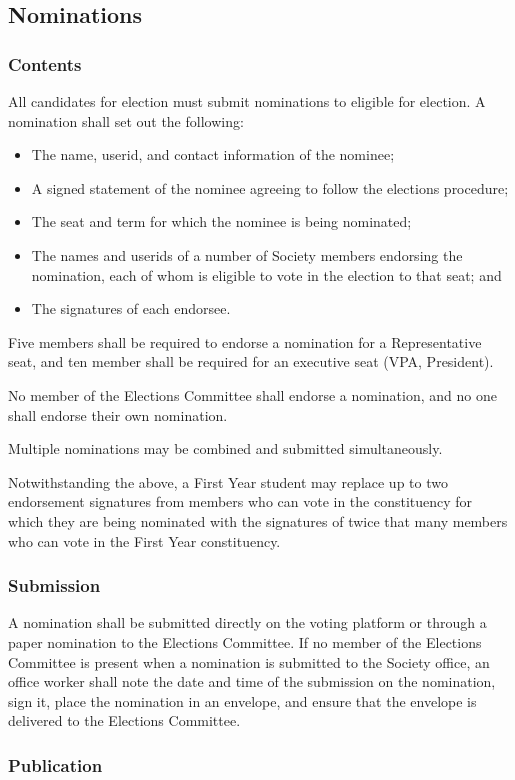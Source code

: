 \subsection{Nominations}
\subsubsection{Contents}
All candidates for election must submit nominations to eligible for election.
A nomination shall set out the following:
\begin{itemize}
\item The name, userid, and contact information of the nominee;
\item A signed statement of the nominee agreeing to follow the elections
procedure;
\item The seat and term for which the nominee is being nominated;
\item The names and userids of a number of Society members endorsing the
nomination, each of whom is eligible to vote in the election to that seat; and
\item The signatures of each endorsee.
\end{itemize}
Five members shall be required to endorse a nomination for a Representative
seat, and ten member shall be required for an executive seat (VPA, President). 

No member of the Elections Committee
shall endorse a nomination, and no one shall endorse their own nomination.

Multiple nominations may be combined and submitted simultaneously.

Notwithstanding the above, a First Year student may replace up to two
endorsement signatures from members who can vote in the constituency for which
they are being nominated with the signatures of twice that many members who can
vote in the First Year constituency.
\subsubsection{Submission}
A nomination shall be submitted directly on the voting platform or through a paper nomination to the Elections Committee. If no member of the Elections Committee is
present when a nomination is submitted to the Society office, an office worker shall
note the date and time of the submission on the nomination, sign it, place the
nomination in an envelope, and ensure that the envelope is delivered to the
Elections Committee.

\subsubsection{Publication}

